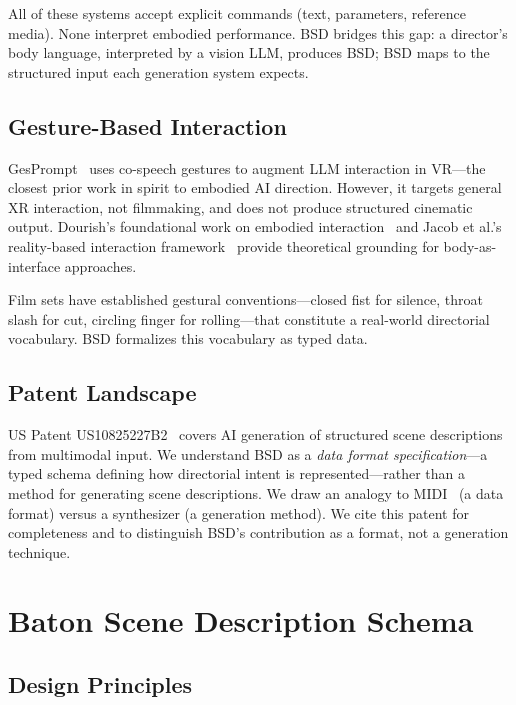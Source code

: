 \documentclass{article}
\begin{document}
All of these systems accept explicit commands (text, parameters, reference media). None interpret embodied performance. BSD bridges this gap: a director's body language, interpreted by a vision LLM, produces BSD; BSD maps to the structured input each generation system expects.

\subsection{Gesture-Based Interaction}

GesPrompt~\cite{gesprompt2025} uses co-speech gestures to augment LLM interaction in VR---the closest prior work in spirit to embodied AI direction. However, it targets general XR interaction, not filmmaking, and does not produce structured cinematic output. Dourish's foundational work on embodied interaction~\cite{dourish2001} and Jacob et al.'s reality-based interaction framework~\cite{jacob2008} provide theoretical grounding for body-as-interface approaches.

Film sets have established gestural conventions---closed fist for silence, throat slash for cut, circling finger for rolling---that constitute a real-world directorial vocabulary. BSD formalizes this vocabulary as typed data.

\subsection{Patent Landscape}

US Patent US10825227B2~\cite{patent_us10825227} covers AI generation of structured scene descriptions from multimodal input. We understand BSD as a \emph{data format specification}---a typed schema defining how directorial intent is represented---rather than a method for generating scene descriptions. We draw an analogy to MIDI~\cite{midi1983} (a data format) versus a synthesizer (a generation method). We cite this patent for completeness and to distinguish BSD's contribution as a format, not a generation technique.

\section{Baton Scene Description Schema}\label{sec:schema}

\subsection{Design Principles}
\end{document}
